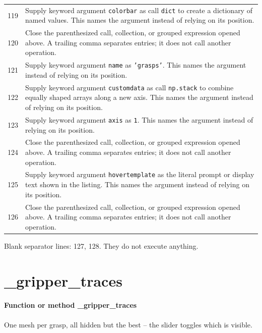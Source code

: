 \documentclass[11pt,a4paper]{book}
\begin{document}
\begin{longtable}{r p{}}
119 & Supply keyword argument \texttt{colorbar} as call \texttt{dict} to create a dictionary of named values. This names the argument instead of relying on its position. \\

120 & Close the parenthesized call, collection, or grouped expression opened above. A trailing comma separates entries; it does not call another operation. \\

121 & Supply keyword argument \texttt{name} as \texttt{'grasps'}. This names the argument instead of relying on its position. \\

122 & Supply keyword argument \texttt{customdata} as call \texttt{np.stack} to combine equally shaped arrays along a new axis. This names the argument instead of relying on its position. \\

123 & Supply keyword argument \texttt{axis} as \texttt{1}. This names the argument instead of relying on its position. \\

124 & Close the parenthesized call, collection, or grouped expression opened above. A trailing comma separates entries; it does not call another operation. \\

125 & Supply keyword argument \texttt{hovertemplate} as the literal prompt or display text shown in the listing. This names the argument instead of relying on its position. \\

126 & Close the parenthesized call, collection, or grouped expression opened above. A trailing comma separates entries; it does not call another operation. \\

\end{longtable}

Blank separator lines: 127, 128. They do not execute anything.

\section{\_gripper\_traces}

\paragraph{Function or method \_gripper\_traces}
One mesh per grasp, all hidden but the best -- the slider toggles which is visible.
\end{document}

